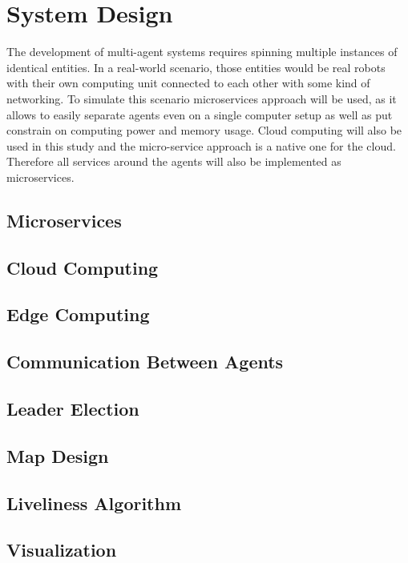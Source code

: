 \chapter{System Design}
The development of multi-agent systems requires spinning multiple instances of identical entities. In a real-world scenario, those entities would be real robots with their own computing unit connected to each other with some kind of networking. To simulate this scenario microservices approach will be used, as it allows to easily separate agents even on a single computer setup as well as put constrain on computing power and memory usage.
Cloud computing will also be used in this study and the micro-service approach is a native one for the cloud. Therefore all services around the agents will also be implemented as microservices.
\section{Microservices}


\section{Cloud Computing}


\section{Edge Computing}


\section{Communication Between Agents}


\section{Leader Election}


\section{Map Design}


\section{Liveliness Algorithm}


\section{Visualization}
